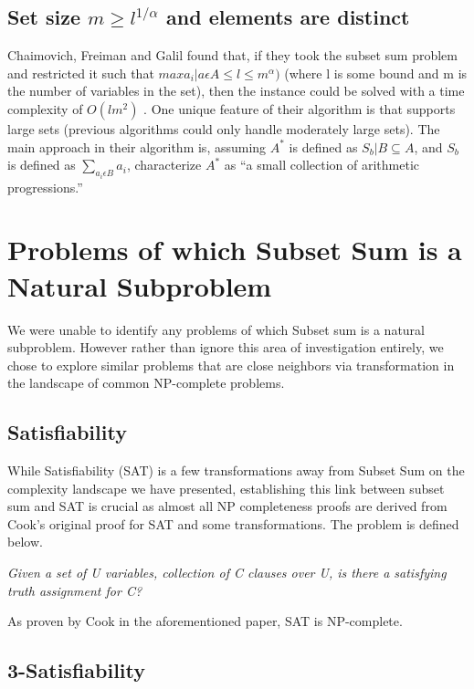 \documentclass{report}
\begin{document}
\subsection{Set size $m \geq l^{1/\alpha}$ and elements are distinct}
Chaimovich, Freiman and Galil found that, if they took the subset sum
problem and restricted it such that $max{a_i | a \epsilon A} \leq l \leq
m^\alpha)$ (where l is some bound and m is the number of variables in the set),
then the instance could be solved with a time complexity of $O(lm^2)$
\cite{chaimovich1989}. One unique
feature of their algorithm is that supports large sets (previous algorithms
could only handle moderately large sets). The main approach in their algorithm
is, assuming $A^*$ is defined as ${S_b | B \subseteq A}$, and $S_b$ is
defined as $\sum_{a_i\epsilon B} a_i$, characterize $A^*$ as ``a small
collection of
arithmetic progressions.'' 

\section{Problems of which Subset Sum is a Natural Subproblem}

We were unable to identify any problems of which Subset sum is a natural subproblem.
However rather than ignore this area of investigation entirely, we chose to explore
similar problems that are close neighbors via transformation in the landscape of common
NP-complete problems.

\subsection{Satisfiability} 

While Satisfiability (SAT) is a few transformations away from Subset Sum on the 
complexity landscape we have presented, establishing this link between subset sum and SAT is
crucial as almost all NP completeness proofs are derived from Cook's original proof for SAT and
some transformations. The problem is defined below.

\textit{Given a set of U variables, collection of C clauses over U, is there a satisfying truth assignment for C?}

As proven by Cook in the aforementioned paper, SAT is NP-complete.

\subsection{3-Satisfiability}
\end{document}
